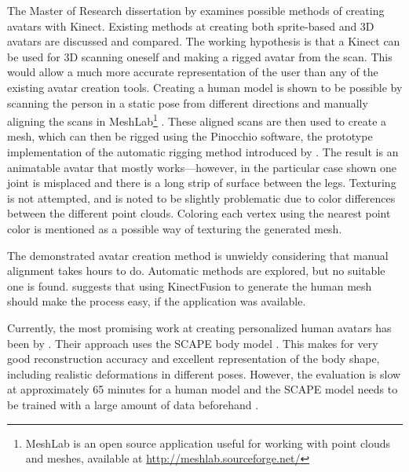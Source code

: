 The Master of Research dissertation by \citet{charpentier2011accurate} examines possible methods of creating avatars with Kinect. Existing methods at creating both sprite-based and 3D avatars are discussed and compared. The working hypothesis is that a Kinect can be used for 3D scanning oneself and making a rigged avatar from the scan. This would allow a much more accurate representation of the user than any of the existing avatar creation tools. Creating a human model is shown to be possible by scanning the person in a static pose from different directions and manually aligning the scans in MeshLab\footnote{MeshLab is an open source application useful for working with point clouds and meshes, available at \url{http://meshlab.sourceforge.net/}} \citep{meshlab}. These aligned scans are then used to create a mesh, which can then be rigged using the Pinocchio software, the prototype implementation of the automatic rigging method introduced by \citep{baran2007automatic}. The result is an animatable avatar that mostly works---however, in the particular case shown one joint is misplaced and there is a long strip of surface between the legs. Texturing is not attempted, and is noted to be slightly problematic due to color differences between the different point clouds. Coloring each vertex using the nearest point color is mentioned as a possible way of texturing the generated mesh. \citep{charpentier2011accurate}

The demonstrated avatar creation method is unwieldy considering that manual alignment takes hours to do. Automatic methods are explored, but no suitable one is found. \citeauthor{charpentier2011accurate} suggests that using KinectFusion to generate the human mesh should make the process easy, if the application was available. \citep{charpentier2011accurate}

\newtopic

Currently, the most promising work at creating personalized human avatars has been by \citet{weiss2011home}. Their approach uses the SCAPE body model \citep{anguelov2005scape}. This makes for very good reconstruction accuracy and excellent representation of the body shape, including realistic deformations in different poses. However, the evaluation is slow at approximately 65 minutes for a human model \citep{weiss2011home} and the SCAPE model needs to be trained with a large amount of data beforehand \citep{anguelov2005scape}.

\newtopic

